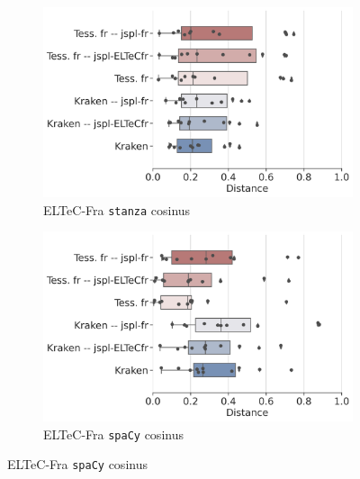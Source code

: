 \begin{figure}

    \begin{subfigure}{0.45\textwidth}
  \includegraphics[height=.65\textwidth]{IMAGES/Boite-moustache/ELTeC-Fra_stanza_cosinus.png} 
        \caption{ELTeC-Fra \texttt{stanza} cosinus}
   \end{subfigure}
    \begin{subfigure}{0.5\textwidth}
  \includegraphics[height=.65\textwidth]{IMAGES/Boite-moustache/ELTeC-Fra_spacy3.5.1_cosinus.png} 
        \caption{ELTeC-Fra \texttt{spaCy} cosinus}
   \end{subfigure}


\end{figure}

